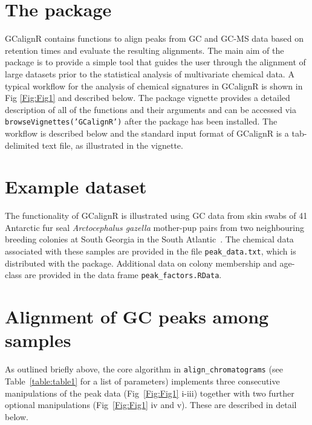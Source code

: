 \documentclass[10pt,letterpaper]{article}
\begin{document}
\section*{The package}
GCalignR contains functions to align peaks from GC and GC-MS data based on retention times and evaluate the resulting alignments. The main aim of the package is to provide a simple tool that guides the user through the alignment of large datasets prior to the statistical analysis of multivariate chemical data. A typical workflow for the analysis of chemical signatures in GCalignR is shown in Fig \ref{Fig:Fig1} and described below. The package vignette provides a detailed description of all of the functions and their arguments and can be accessed via \texttt{browseVignettes('GCalignR')} after the package has been installed. The workflow is described below and the standard input format of GCalignR is a tab-delimited text file, as illustrated in the vignette.

\section*{Example dataset}
The functionality of GCalignR is illustrated using GC data from skin swabs of 41 Antarctic fur seal \textit{Arctocephalus gazella} mother-pup pairs from two neighbouring breeding colonies at South Georgia in the South Atlantic~\cite{Stoffel.2015}. The chemical data associated with these samples are provided in the file \texttt{peak\_data.txt}, which is distributed with the package. Additional data on colony membership and age-class are provided in the data frame \texttt{peak\_factors.RData}.

\section*{Alignment of GC peaks among samples}
As outlined briefly above, the core algorithm in \texttt{align\_chromatograms} (see Table~\ref{table:table1} for a list of parameters) implements three consecutive manipulations of the peak data (Fig~\ref{Fig:Fig1} i-iii) together with two further optional manipulations (Fig~\ref{Fig:Fig1} iv and v). These are described in detail below.
\end{document}
